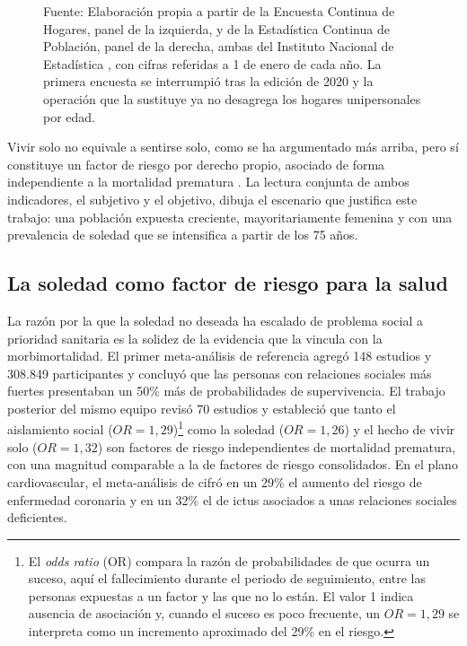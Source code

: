 \begin{figure}[htbp]
    \vspace{2pt}
    \parbox{0.94\textwidth}{\footnotesize Fuente: Elaboración propia a partir de la Encuesta Continua de
    Hogares, panel de la izquierda, y de la Estadística Continua de Población, panel de la derecha, ambas
    del Instituto Nacional de Estadística \citep{INEech2020,INEecp2026}, con cifras referidas a 1 de enero
    de cada año. La primera encuesta se interrumpió tras la edición de 2020 y la operación que la sustituye
    ya no desagrega los hogares unipersonales por edad.}
\end{figure}

Vivir solo no equivale a sentirse solo, como se ha argumentado más arriba, pero sí constituye un factor de
riesgo por derecho propio, asociado de forma independiente a la mortalidad prematura \citep{HoltLunstad2015}.
La lectura conjunta de ambos indicadores, el subjetivo y el objetivo, dibuja el escenario que justifica este
trabajo: una población expuesta creciente, mayoritariamente femenina y con una prevalencia de soledad que se
intensifica a partir de los 75 años.

\subsection{La soledad como factor de riesgo para la salud}

La razón por la que la soledad no deseada ha escalado de problema social a prioridad sanitaria es la solidez
de la evidencia que la vincula con la morbimortalidad. El primer meta-análisis de referencia
\citep{HoltLunstad2010} agregó 148 estudios y 308.849 participantes y concluyó que las personas con
relaciones sociales más fuertes presentaban un 50\% más de probabilidades de supervivencia. El trabajo
posterior del mismo equipo \citep{HoltLunstad2015} revisó 70 estudios y estableció que tanto el aislamiento
social ($OR = 1{,}29$)\footnote{El \textit{odds ratio} (OR) compara la razón de probabilidades de que ocurra
un suceso, aquí el fallecimiento durante el periodo de seguimiento, entre las personas expuestas a un factor
y las que no lo están. El valor 1 indica ausencia de asociación y, cuando el suceso es poco frecuente, un
$OR = 1{,}29$ se interpreta como un incremento aproximado del 29\% en el riesgo.} como la soledad
($OR = 1{,}26$) y el hecho de vivir solo ($OR = 1{,}32$) son factores
de riesgo independientes de mortalidad prematura, con una magnitud comparable a la de factores de riesgo
consolidados. En el plano cardiovascular, el meta-análisis de \textcite{Valtorta2016} cifró en un 29\% el
aumento del riesgo de enfermedad coronaria y en un 32\% el de ictus asociados a unas relaciones sociales
deficientes.


